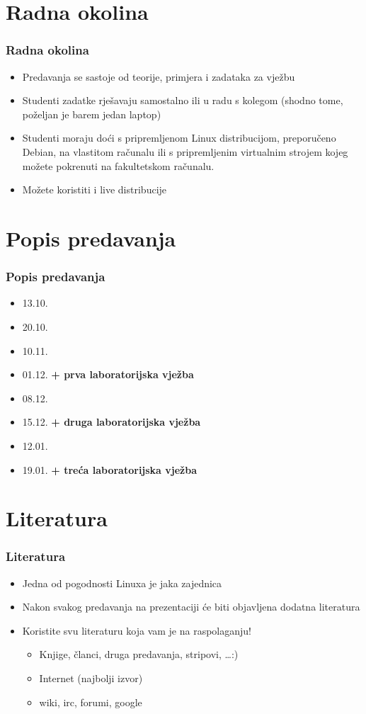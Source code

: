 \documentclass{beamer}
\begin{document}
\section{Radna okolina}
\begin{frame}[t]
\frametitle{Radna okolina}
\begin{itemize}
	\item Predavanja se sastoje od teorije, primjera i zadataka za vježbu
	\item Studenti zadatke rješavaju samostalno ili u radu s kolegom (shodno tome, poželjan je barem jedan laptop)
	\item Studenti moraju doći s pripremljenom Linux distribucijom, preporučeno Debian, na vlastitom računalu ili s pripremljenim virtualnim strojem kojeg možete pokrenuti na fakultetskom računalu.
	\item Možete koristiti i live distribucije
\end{itemize}
\end{frame}

\section{Popis predavanja}
\begin{frame}[t]
\frametitle{Popis predavanja}
\begin{itemize}
	\item 13.10.
	\item 20.10.
	\item 10.11.
	\item 01.12. \textbf{+ prva laboratorijska vježba}
	\item 08.12.
	\item 15.12. \textbf{+ druga laboratorijska vježba}
	\item 12.01.
	\item 19.01. \textbf{+ treća laboratorijska vježba}
\end{itemize}
\end{frame}

\section{Literatura}
\begin{frame}[t]
\frametitle{Literatura}
\begin{itemize}
	\item Jedna od pogodnosti Linuxa je jaka zajednica
	\item Nakon svakog predavanja na prezentaciji će biti objavljena dodatna literatura
	\item Koristite svu literaturu koja vam je na raspolaganju!
	\begin{itemize}
		\item Knjige, članci, druga predavanja, stripovi, \ldots :)
		\item Internet (najbolji izvor)
		\item wiki, irc, forumi, google
	\end{itemize}
\end{itemize}
\end{frame}
\end{document}
